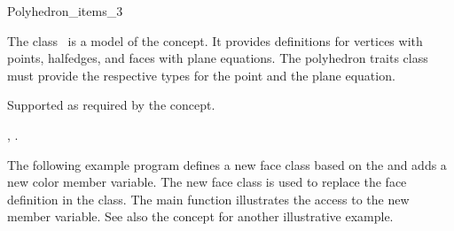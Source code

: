 
\ccRefPageBegin



\begin{ccRefClass}{Polyhedron_items_3}

\ccDefinition
  
The class \ccRefName\ is a model of the 
concept.  It provides definitions for vertices with points, halfedges,
and faces with plane equations. The polyhedron traits class must
provide the respective types for the point and the plane equation.


\ccIsModel


\ccThreeToTwo

\ccGlue
{}



\ccGlue
{}
\ccGlue
{}
\ccGlue
{}

\ccCreation
{}  %


\ccOperations

Supported as required by the  concept.

\ccSeeAlso

,
.

\ccExample

The following example program defines a new face class based on the
 and adds a new color member variable.
The new face class is used to replace the face definition in the
 class. The main function illustrates the
access to the new member variable.
See also the  concept for another illustrative
example.


\end{ccRefClass}

\ccRefPageEnd

